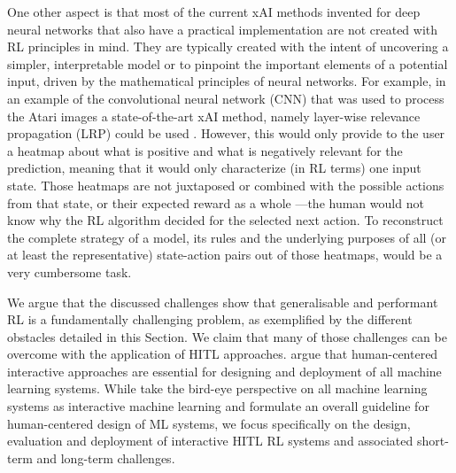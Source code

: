 \documentclass[twoside,11pt]{article}
\begin{document}
\begin{enumerate}
One other aspect is that most of the current xAI methods invented for deep neural networks that also have a practical implementation are not created with RL principles in mind. They are typically created with the intent of uncovering a simpler, interpretable model or to pinpoint the important elements of a potential input, driven by the mathematical principles of neural networks. For example, in an example of the convolutional neural network (CNN) that was used to process the Atari images \citep{Mnih:2013:PlayingAtariDeepRL} a state-of-the-art xAI method, namely layer-wise relevance propagation (LRP) could be used \citep{Bach:2015:LayerWiseRelevancePropagation,Alber:2019:Innvestigate}. However, this would only provide to the user a heatmap about what is positive and what is negatively relevant for the prediction, meaning that it would only characterize (in RL terms) one input state. Those heatmaps are not juxtaposed or combined with the possible actions from that state, or their expected reward as a whole ---the human would not know why the RL algorithm decided for the selected next action. To reconstruct the complete strategy of a model, its rules and the underlying purposes of all (or at least the representative) state-action pairs out of those heatmaps, would be a very cumbersome task. 

We argue that the discussed challenges show that generalisable and performant RL is a fundamentally challenging problem, as exemplified by the different obstacles detailed in this Section. We claim that many of those challenges can be overcome with the application of HITL approaches. 
 \citet{MatthewsonPilarski:2022:DesigningAndEvaluatingHCIML} argue that human-centered interactive approaches are essential for designing and deployment of all machine learning systems. While \citet{MatthewsonPilarski:2022:DesigningAndEvaluatingHCIML} take the bird-eye perspective on all machine learning systems as interactive machine learning and formulate an overall guideline for human-centered design of ML systems, we focus specifically on the design, evaluation and deployment of interactive HITL RL systems and associated short-term and long-term challenges.


\end{enumerate}
\end{document}
